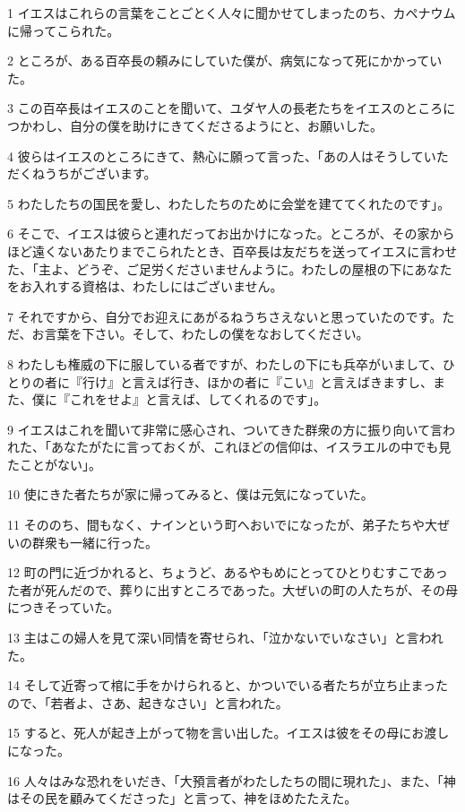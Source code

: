 \par 1 イエスはこれらの言葉をことごとく人々に聞かせてしまったのち、カペナウムに帰ってこられた。
\par 2 ところが、ある百卒長の頼みにしていた僕が、病気になって死にかかっていた。
\par 3 この百卒長はイエスのことを聞いて、ユダヤ人の長老たちをイエスのところにつかわし、自分の僕を助けにきてくださるようにと、お願いした。
\par 4 彼らはイエスのところにきて、熱心に願って言った、「あの人はそうしていただくねうちがございます。
\par 5 わたしたちの国民を愛し、わたしたちのために会堂を建ててくれたのです」。
\par 6 そこで、イエスは彼らと連れだってお出かけになった。ところが、その家からほど遠くないあたりまでこられたとき、百卒長は友だちを送ってイエスに言わせた、「主よ、どうぞ、ご足労くださいませんように。わたしの屋根の下にあなたをお入れする資格は、わたしにはございません。
\par 7 それですから、自分でお迎えにあがるねうちさえないと思っていたのです。ただ、お言葉を下さい。そして、わたしの僕をなおしてください。
\par 8 わたしも権威の下に服している者ですが、わたしの下にも兵卒がいまして、ひとりの者に『行け』と言えば行き、ほかの者に『こい』と言えばきますし、また、僕に『これをせよ』と言えば、してくれるのです」。
\par 9 イエスはこれを聞いて非常に感心され、ついてきた群衆の方に振り向いて言われた、「あなたがたに言っておくが、これほどの信仰は、イスラエルの中でも見たことがない」。
\par 10 使にきた者たちが家に帰ってみると、僕は元気になっていた。
\par 11 そののち、間もなく、ナインという町へおいでになったが、弟子たちや大ぜいの群衆も一緒に行った。
\par 12 町の門に近づかれると、ちょうど、あるやもめにとってひとりむすこであった者が死んだので、葬りに出すところであった。大ぜいの町の人たちが、その母につきそっていた。
\par 13 主はこの婦人を見て深い同情を寄せられ、「泣かないでいなさい」と言われた。
\par 14 そして近寄って棺に手をかけられると、かついでいる者たちが立ち止まったので、「若者よ、さあ、起きなさい」と言われた。
\par 15 すると、死人が起き上がって物を言い出した。イエスは彼をその母にお渡しになった。
\par 16 人々はみな恐れをいだき、「大預言者がわたしたちの間に現れた」、また、「神はその民を顧みてくださった」と言って、神をほめたたえた。
